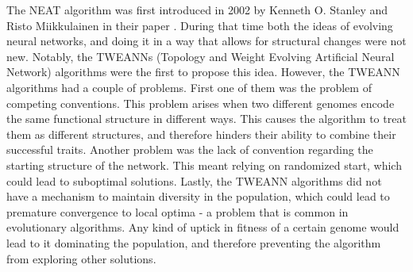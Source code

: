 \documentclass{article}
\begin{document}
The NEAT algorithm was first introduced in 2002 by Kenneth O. Stanley and Risto Miikkulainen in their paper \cite{originalNeat}. 
During that time both the ideas of evolving neural networks, and doing it in a way that allows for structural changes were not new.
Notably, the TWEANNs (Topology and Weight Evolving Artificial Neural Network) algorithms were the first to propose this idea.
However, the TWEANN algorithms had a couple of problems. 
First one of them was the problem of competing conventions. This problem arises when two different genomes encode the same
functional structure in different ways. This causes the algorithm to treat them as different structures, and therefore hinders
their ability to combine their successful traits. Another problem was the lack of convention regarding the starting structure
of the network. This meant relying on randomized start, which could lead to suboptimal solutions. Lastly, the TWEANN algorithms
did not have a mechanism to maintain diversity in the population, which could lead to premature convergence to local optima - 
a problem that is common in evolutionary algorithms. Any kind of uptick in fitness of a certain genome would lead to it dominating
the population, and therefore preventing the algorithm from exploring other solutions.  
\end{document}
